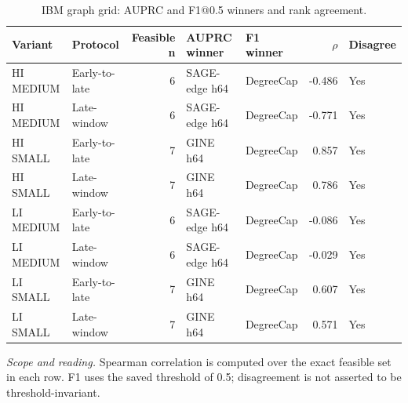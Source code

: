 \begin{table}[tbp]
\centering
\footnotesize
\setlength{\tabcolsep}{3.2pt}
\renewcommand{\arraystretch}{1.12}
\caption{IBM graph grid: AUPRC and F1@0.5 winners and rank agreement.}
\label{tab:s-rank-graph_grid}
\begin{tabularx}{\textwidth}{@{}>{\raggedright\arraybackslash}p{} >{\raggedright\arraybackslash}p{} r Y Y r l@{}}
\toprule
\textbf{Variant} & \textbf{Protocol} & \textbf{Feasible n} & \textbf{AUPRC winner} & \textbf{F1 winner} & \textbf{$\rho$} & \textbf{Disagree} \\
\midrule
HI MEDIUM & Early-to-late & 6 & SAGE-edge h64 & DegreeCap & -0.486 & Yes \\
HI MEDIUM & Late-window & 6 & SAGE-edge h64 & DegreeCap & -0.771 & Yes \\
HI SMALL & Early-to-late & 7 & GINE h64 & DegreeCap & 0.857 & Yes \\
HI SMALL & Late-window & 7 & GINE h64 & DegreeCap & 0.786 & Yes \\
LI MEDIUM & Early-to-late & 6 & SAGE-edge h64 & DegreeCap & -0.086 & Yes \\
LI MEDIUM & Late-window & 6 & SAGE-edge h64 & DegreeCap & -0.029 & Yes \\
LI SMALL & Early-to-late & 7 & GINE h64 & DegreeCap & 0.607 & Yes \\
LI SMALL & Late-window & 7 & GINE h64 & DegreeCap & 0.571 & Yes \\
\bottomrule
\end{tabularx}
\vspace{2pt}
\begin{minipage}{\textwidth}\footnotesize\emph{Scope and reading.} Spearman correlation is computed over the exact feasible set in each row. F1 uses the saved threshold of 0.5; disagreement is not asserted to be threshold-invariant.\end{minipage}
\end{table}
